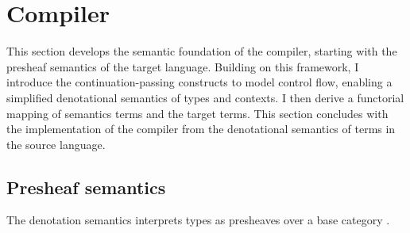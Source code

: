 \documentclass[12pt,a4paper]{report}
\theoremstyle{definition}
\newcommand{\mb}[1]{\textcolor{mediumblue}{#1}}
\newcommand{\bN}{\ensuremath{\mathbb{N}}}
\begin{document}



    

    \section{Compiler} \label{sec: compiler}
    This section develops the semantic foundation of the compiler, starting with the presheaf semantics of the target language. Building on this framework, I introduce the continuation-passing constructs to model control flow, enabling a simplified denotational semantics of types and contexts. I then derive a functorial mapping of semantics terms and the target terms. This section concludes with the implementation of the compiler from the denotational semantics of terms in the source language.
    \subsection{Presheaf semantics}
    The denotation semantics interprets types as presheaves over a base category \text{\Upsigma}. 
\end{document}
